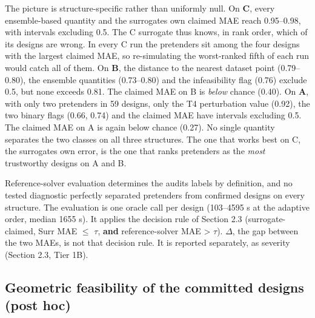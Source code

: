 \documentclass[11pt,a4paper]{article}
\newcounter{none}   %
\begin{document}
The picture is structure-specific rather than uniformly null. On \textbf{C}, every
ensemble-based quantity and the surrogate\textquotesingle s own claimed MAE reach 0.95--0.98, with
intervals excluding 0.5. The C surrogate thus knows, in rank order, which of its designs
are wrong. In every C run the pretenders sit among the four designs with the largest
claimed MAE, so re-simulating the worst-ranked fifth of each run would catch all of them.
On \textbf{B}, the distance to the nearest dataset point (0.79--0.80), the ensemble quantities
(0.73--0.80) and the infeasibility flag (0.76) exclude 0.5, but none exceeds 0.81. The
claimed MAE on B is \emph{below} chance (0.40). On \textbf{A}, with only two pretenders in 59
designs, only the T4 perturbation value (0.92), the two binary flags (0.66, 0.74) and the
claimed MAE have intervals excluding 0.5. The claimed MAE on A is again below chance
(0.27). No single quantity separates the two classes on all three structures. The one that
works best on C, the surrogate\textquotesingle s own error, is the one that ranks pretenders as the \emph{most}
trustworthy designs on A and B.

Reference-solver evaluation determines the audit\textquotesingle s labels by definition, and no tested
diagnostic perfectly separated pretenders from confirmed designs on every structure. The
evaluation is one oracle call per design (103--4595 s at the adaptive order, median
1655 s). It applies the decision rule of Section 2.3 (surrogate-claimed, Surr MAE \ensuremath{\leq} \ensuremath{\tau},
\textbf{and} reference-solver MAE \textgreater{} \ensuremath{\tau}). \ensuremath{\Delta}, the gap between the two MAEs, is not that decision
rule. It is reported separately, as severity (Section 2.3, Tier 1B).

\subsection{Geometric feasibility of the committed designs (post hoc)}\label{sec:3.8}
\end{document}
